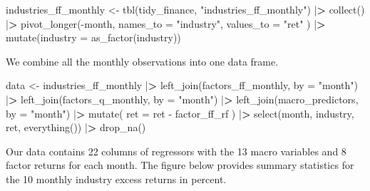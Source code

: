 \documentclass[
]{book}
\newenvironment{Shaded}{\begin{snugshade}}{\end{snugshade}}
\newcommand{\AttributeTok}[1]{\textcolor[rgb]{0.61,0.61,0.61}{#1}}
\newcommand{\ErrorTok}[1]{\textcolor[rgb]{0.14,0.14,0.14}{\textbf{#1}}}
\newcommand{\FunctionTok}[1]{\textcolor[rgb]{0,0,0}{#1}}
\newcommand{\NormalTok}[1]{#1}
\newcommand{\OtherTok}[1]{\textcolor[rgb]{0.37,0.37,0.37}{#1}}
\newcommand{\SpecialCharTok}[1]{\textcolor[rgb]{0,0,0}{#1}}
\newcommand{\StringTok}[1]{\textcolor[rgb]{0.5,0.5,0.5}{#1}}
\begin{document}
\begin{Shaded}
\begin{Highlighting}[]
\NormalTok{industries\_ff\_monthly }\OtherTok{\textless{}{-}} \FunctionTok{tbl}\NormalTok{(tidy\_finance, }\StringTok{"industries\_ff\_monthly"}\NormalTok{) }\SpecialCharTok{|}\ErrorTok{\textgreater{}}
  \FunctionTok{collect}\NormalTok{() }\SpecialCharTok{|}\ErrorTok{\textgreater{}}
  \FunctionTok{pivot\_longer}\NormalTok{(}\SpecialCharTok{{-}}\NormalTok{month,}
    \AttributeTok{names\_to =} \StringTok{"industry"}\NormalTok{, }\AttributeTok{values\_to =} \StringTok{"ret"}
\NormalTok{  ) }\SpecialCharTok{|}\ErrorTok{\textgreater{}}
  \FunctionTok{mutate}\NormalTok{(}\AttributeTok{industry =} \FunctionTok{as\_factor}\NormalTok{(industry))}
\end{Highlighting}
\end{Shaded}

We combine all the monthly observations into one data frame.

\begin{Shaded}
\begin{Highlighting}[]
\NormalTok{data }\OtherTok{\textless{}{-}}\NormalTok{ industries\_ff\_monthly }\SpecialCharTok{|}\ErrorTok{\textgreater{}}
  \FunctionTok{left\_join}\NormalTok{(factors\_ff\_monthly, }\AttributeTok{by =} \StringTok{"month"}\NormalTok{) }\SpecialCharTok{|}\ErrorTok{\textgreater{}}
  \FunctionTok{left\_join}\NormalTok{(factors\_q\_monthly, }\AttributeTok{by =} \StringTok{"month"}\NormalTok{) }\SpecialCharTok{|}\ErrorTok{\textgreater{}}
  \FunctionTok{left\_join}\NormalTok{(macro\_predictors, }\AttributeTok{by =} \StringTok{"month"}\NormalTok{) }\SpecialCharTok{|}\ErrorTok{\textgreater{}}
  \FunctionTok{mutate}\NormalTok{(}
    \AttributeTok{ret =}\NormalTok{ ret }\SpecialCharTok{{-}}\NormalTok{ factor\_ff\_rf}
\NormalTok{  ) }\SpecialCharTok{|}\ErrorTok{\textgreater{}}
  \FunctionTok{select}\NormalTok{(month, industry, ret, }\FunctionTok{everything}\NormalTok{()) }\SpecialCharTok{|}\ErrorTok{\textgreater{}}
  \FunctionTok{drop\_na}\NormalTok{()}
\end{Highlighting}
\end{Shaded}

Our data contains 22 columns of regressors with the 13 macro variables and 8 factor returns for each month.
The figure below provides summary statistics for the 10 monthly industry excess returns in percent.
\end{document}
